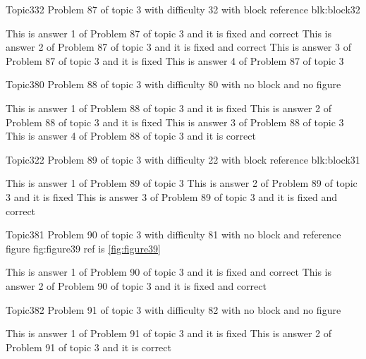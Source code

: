 \documentclass[master]{exam}
\begin{document}
\begin{problem}[requires=blk:block32]{Topic3}{32}
	Problem 87 of topic 3 with difficulty 32 with block reference blk:block32
	\begin{answers}
		 This is answer 1 of Problem 87 of topic 3 and it is fixed and correct
		 This is answer 2 of Problem 87 of topic 3 and it is fixed and correct
		\answer[fixed] This is answer 3 of Problem 87 of topic 3 and it is fixed
		\answer This is answer 4 of Problem 87 of topic 3 
	\end{answers}
\end{problem}

\begin{problem}{Topic3}{80}
	Problem 88 of topic 3 with difficulty 80 with no block and no figure
	\begin{answers}
		\answer[fixed] This is answer 1 of Problem 88 of topic 3 and it is fixed
		\answer[fixed] This is answer 2 of Problem 88 of topic 3 and it is fixed
		\answer This is answer 3 of Problem 88 of topic 3 
		\answer[correct] This is answer 4 of Problem 88 of topic 3 and it is correct
	\end{answers}
\end{problem}

\begin{problem}[requires=blk:block31]{Topic3}{22}
	Problem 89 of topic 3 with difficulty 22 with block reference blk:block31
	\begin{answers}
		\answer This is answer 1 of Problem 89 of topic 3 
		\answer[fixed] This is answer 2 of Problem 89 of topic 3 and it is fixed
		 This is answer 3 of Problem 89 of topic 3 and it is fixed and correct
	\end{answers}
\end{problem}

\begin{problem}{Topic3}{81}
	Problem 90 of topic 3 with difficulty 81 with no block and reference figure fig:figure39 ref is \ref{fig:figure39}
	\begin{answers}
		 This is answer 1 of Problem 90 of topic 3 and it is fixed and correct
		 This is answer 2 of Problem 90 of topic 3 and it is fixed and correct
	\end{answers}
\end{problem}

\begin{problem}{Topic3}{82}
	Problem 91 of topic 3 with difficulty 82 with no block and no figure
	\begin{answers}
		\answer[fixed] This is answer 1 of Problem 91 of topic 3 and it is fixed
		\answer[correct] This is answer 2 of Problem 91 of topic 3 and it is correct
	\end{answers}
\end{problem}
\end{document}
